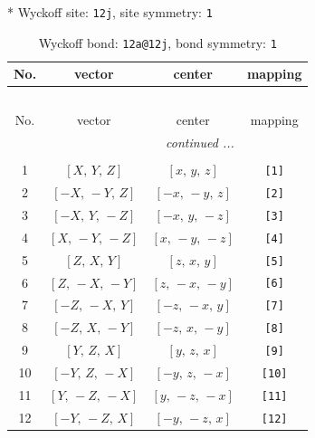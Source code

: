 \documentclass[fleqn,8pt]{jsarticle}
\begin{document}
* Wyckoff site: {\tt 12j}, site symmetry: {\tt 1}
\renewcommand{\arraystretch}{1.2}
\begin{longtable}{cccc}
\caption{Wyckoff bond: {\tt 12a@12j}, bond symmetry: {\tt 1}}
 \\
 \hline \hline
No. & vector & center & mapping \\ \hline \endfirsthead

\multicolumn{3}{l}{\tablename\ \thetable{}} \\
 \hline \hline
No. & vector & center & mapping \\ \hline \endhead

 \hline \hline
\multicolumn{3}{r}{\footnotesize\it continued ...} \\ \endfoot

 \hline \hline
\multicolumn{3}{r}{} \\ \endlastfoot

1 & $\left[ X,\, Y,\, Z \right]$ & $\left[ x,\, y,\, z \right]$ & {\tt [1]} \\ \hline
2 & $\left[ - X,\, - Y,\, Z \right]$ & $\left[ - x,\, - y,\, z \right]$ & {\tt [2]} \\ \hline
3 & $\left[ - X,\, Y,\, - Z \right]$ & $\left[ - x,\, y,\, - z \right]$ & {\tt [3]} \\ \hline
4 & $\left[ X,\, - Y,\, - Z \right]$ & $\left[ x,\, - y,\, - z \right]$ & {\tt [4]} \\ \hline
5 & $\left[ Z,\, X,\, Y \right]$ & $\left[ z,\, x,\, y \right]$ & {\tt [5]} \\ \hline
6 & $\left[ Z,\, - X,\, - Y \right]$ & $\left[ z,\, - x,\, - y \right]$ & {\tt [6]} \\ \hline
7 & $\left[ - Z,\, - X,\, Y \right]$ & $\left[ - z,\, - x,\, y \right]$ & {\tt [7]} \\ \hline
8 & $\left[ - Z,\, X,\, - Y \right]$ & $\left[ - z,\, x,\, - y \right]$ & {\tt [8]} \\ \hline
9 & $\left[ Y,\, Z,\, X \right]$ & $\left[ y,\, z,\, x \right]$ & {\tt [9]} \\ \hline
10 & $\left[ - Y,\, Z,\, - X \right]$ & $\left[ - y,\, z,\, - x \right]$ & {\tt [10]} \\ \hline
11 & $\left[ Y,\, - Z,\, - X \right]$ & $\left[ y,\, - z,\, - x \right]$ & {\tt [11]} \\ \hline
12 & $\left[ - Y,\, - Z,\, X \right]$ & $\left[ - y,\, - z,\, x \right]$ & {\tt [12]} \\
\end{longtable}
\end{document}
